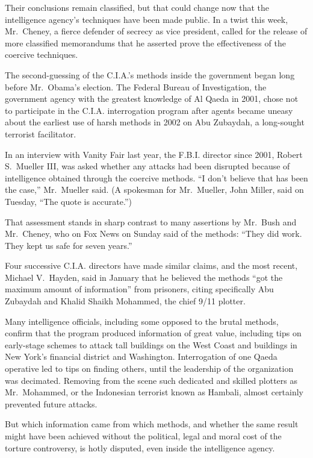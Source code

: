 \documentclass[12pt,a4paper,onecolumn]{article}
\begin{document}
Their conclusions remain classified, but that could change now that the intelligence agency's
techniques have been made public. In a twist this week, Mr.~Cheney, a fierce defender of secrecy as
vice president, called for the release of more classified memorandums that he asserted prove the
effectiveness of the coercive techniques.

The second-guessing of the C.I.A.'s methods inside the government began long before Mr.~Obama's
election. The Federal Bureau of Investigation, the government agency with the greatest knowledge of
Al Qaeda in 2001, chose not to participate in the C.I.A. interrogation program after agents became
uneasy about the earliest use of harsh methods in 2002 on Abu Zubaydah, a long-sought terrorist
facilitator.

In an interview with Vanity Fair last year, the F.B.I. director since 2001, Robert S.~Mueller III,
was asked whether any attacks had been disrupted because of intelligence obtained through the
coercive methods. ``I don't believe that has been the case,'' Mr.~Mueller said. (A spokesman for
Mr.~Mueller, John Miller, said on Tuesday, ``The quote is accurate.'')

That assessment stands in sharp contrast to many assertions by Mr.~Bush and Mr.~Cheney, who on Fox
News on Sunday said of the methods: ``They did work. They kept us safe for seven years.''

Four successive C.I.A. directors have made similar claims, and the most recent, Michael V.~Hayden,
said in January that he believed the methods ``got the maximum amount of information'' from
prisoners, citing specifically Abu Zubaydah and Khalid Shaikh Mohammed, the chief 9/11 plotter.

Many intelligence officials, including some opposed to the brutal methods, confirm that the program
produced information of great value, including tips on early-stage schemes to attack tall buildings
on the West Coast and buildings in New York's financial district and Washington. Interrogation of
one Qaeda operative led to tips on finding others, until the leadership of the organization was
decimated. Removing from the scene such dedicated and skilled plotters as Mr.~Mohammed, or the
Indonesian terrorist known as Hambali, almost certainly prevented future attacks.

But which information came from which methods, and whether the same result might have been achieved
without the political, legal and moral cost of the torture controversy, is hotly disputed, even
inside the intelligence agency.
\end{document}
